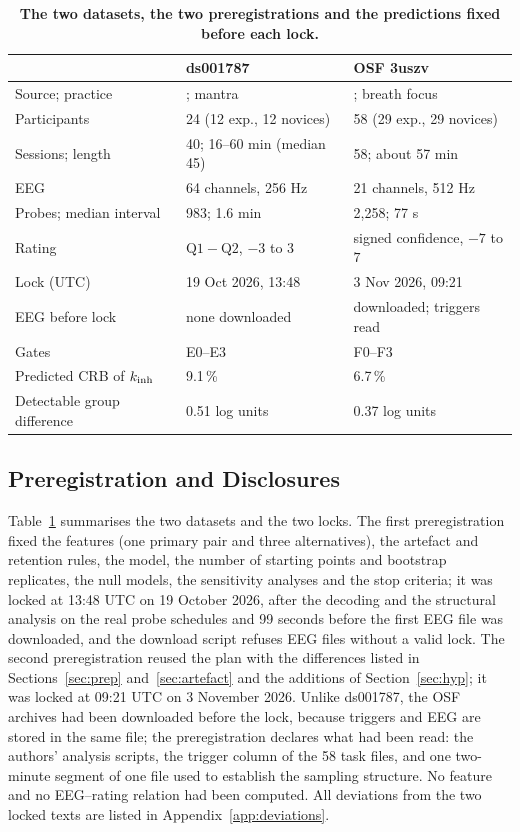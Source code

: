 \begin{table}[t]
\caption{\textbf{The two datasets, the two preregistrations and the predictions fixed before each lock.}}
\label{tab:datasets}
\centering\scriptsize
\setlength{\tabcolsep}{1.5pt}
\begin{tabular}{lll}
\toprule
 & ds001787 & OSF 3uszv \\
\midrule
Source; practice & \cite{Brandmeyer2018}; mantra & \cite{RodriguezLarios2021}; breath focus \\
Participants & 24 (12 exp., 12 novices) & 58 (29 exp., 29 novices) \\
Sessions; length & 40; 16--60 min (median 45) & 58; about 57 min \\
EEG & 64 channels, 256 Hz & 21 channels, 512 Hz \\
Probes; median interval & 983; 1.6 min & 2,258; 77 s \\
Rating & $\mathrm{Q1}-\mathrm{Q2}$, $-3$ to $3$ & signed confidence, $-7$ to $7$ \\
Lock (UTC) & 19 Oct 2026, 13:48 & 3 Nov 2026, 09:21 \\
EEG before lock & none downloaded & downloaded; triggers read \\
Gates & E0--E3 & F0--F3 \\
Predicted CRB of $k_{\mathrm{inh}}$ & 9.1\,\% & 6.7\,\% \\
Detectable group difference & 0.51 log units & 0.37 log units \\
\bottomrule
\end{tabular}
\end{table}

\subsection{Preregistration and Disclosures}
\label{sec:prereg}
Table~\ref{tab:datasets} summarises the two datasets and the two locks. The first preregistration fixed the features (one primary pair and three alternatives), the artefact and retention rules, the model, the number of starting points and bootstrap replicates, the null models, the sensitivity analyses and the stop criteria; it was locked at 13:48 UTC on 19 October 2026, after the decoding and the structural analysis on the real probe schedules and 99 seconds before the first EEG file was downloaded, and the download script refuses EEG files without a valid lock. The second preregistration reused the plan with the differences listed in Sections~\ref{sec:prep} and~\ref{sec:artefact} and the additions of Section~\ref{sec:hyp}; it was locked at 09:21 UTC on 3 November 2026. Unlike ds001787, the OSF archives had been downloaded before the lock, because triggers and EEG are stored in the same file; the preregistration declares what had been read: the authors' analysis scripts, the trigger column of the 58 task files, and one two-minute segment of one file used to establish the sampling structure. No feature and no EEG--rating relation had been computed. All deviations from the two locked texts are listed in Appendix~\ref{app:deviations}.

